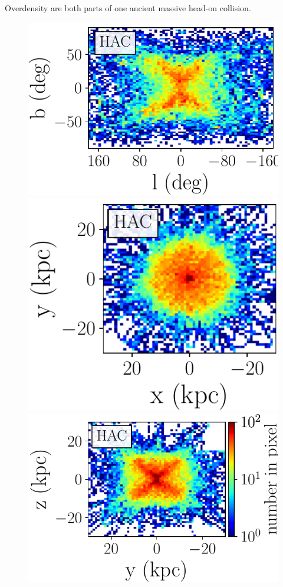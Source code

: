 \documentclass[fleqn,usenatbib]{mnras}
\begin{document}
Overdensity are both parts of one ancient massive head-on collision.
%
%
\begin{figure}
	     \includegraphics[scale=0.302]{HAC_orbits_8Gyrs_lb_defaultmass.pdf}
             \includegraphics[scale=0.302]{HAC_orbits_8Gyrs_xy_defaultmass.pdf}
             \includegraphics[scale=0.302]{HAC_orbits_8Gyrs_yz_defaultmass.pdf}

\end{figure}
\end{document}
